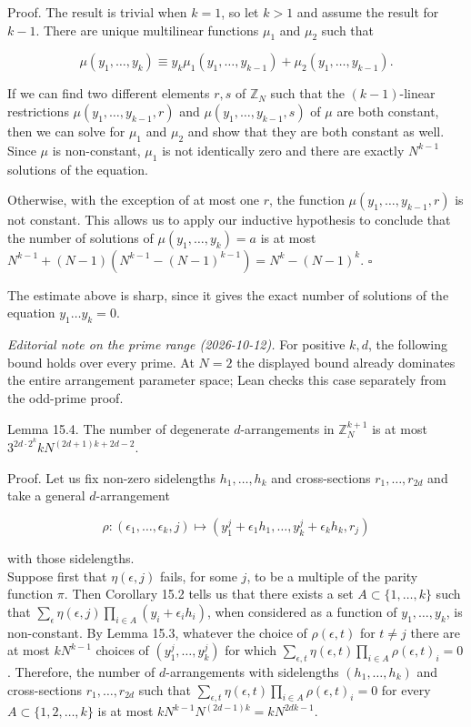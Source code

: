 \documentclass[10pt]{article}
\begin{document}
Proof. The result is trivial when $k=1$, so let $k>1$ and assume the result for $k-1$. There are unique multilinear functions $\mu_{1}$ and $\mu_{2}$ such that

$$
\mu\left(y_{1}, \ldots, y_{k}\right) \equiv y_{k} \mu_{1}\left(y_{1}, \ldots, y_{k-1}\right)+\mu_{2}\left(y_{1}, \ldots, y_{k-1}\right) .
$$

If we can find two different elements $r, s$ of $\mathbb{Z}_{N}$ such that the $(k-1)$-linear restrictions $\mu\left(y_{1}, \ldots, y_{k-1}, r\right)$ and $\mu\left(y_{1}, \ldots, y_{k-1}, s\right)$ of $\mu$ are both constant, then we can solve for $\mu_{1}$ and $\mu_{2}$ and show that they are both constant as well. Since $\mu$ is non-constant, $\mu_{1}$ is not identically zero and there are exactly $N^{k-1}$ solutions of the equation.

Otherwise, with the exception of at most one $r$, the function $\mu\left(y_{1}, \ldots, y_{k-1}, r\right)$ is not constant. This allows us to apply our inductive hypothesis to conclude that the number of solutions of $\mu\left(y_{1}, \ldots, y_{k}\right)=a$ is at most $N^{k-1}+(N-1)\left(N^{k-1}-(N-1)^{k-1}\right)=N^{k}-(N-1)^{k}$. \(\square\)

The estimate above is sharp, since it gives the exact number of solutions of the equation $y_{1} \ldots y_{k}=0$.

\emph{Editorial note on the prime range (2026-10-12).}
For positive $k,d$, the following bound holds over every prime. At $N=2$
the displayed bound already dominates the entire arrangement parameter
space; Lean checks this case separately from the odd-prime proof.

Lemma 15.4. The number of degenerate $d$-arrangements in $\mathbb{Z}_{N}^{k+1}$ is at most $3^{2 d \cdot 2^{k}} k N^{(2 d+1) k+2 d-2}$.

Proof. Let us fix non-zero sidelengths $h_{1}, \ldots, h_{k}$ and cross-sections $r_{1}, \ldots, r_{2 d}$ and take a general $d$-arrangement

$$
\rho:\left(\epsilon_{1}, \ldots, \epsilon_{k}, j\right) \mapsto\left(y_{1}^{j}+\epsilon_{1} h_{1}, \ldots, y_{k}^{j}+\epsilon_{k} h_{k}, r_{j}\right)
$$

with those sidelengths.\\
Suppose first that $\eta(\epsilon, j)$ fails, for some $j$, to be a multiple of the parity function $\pi$. Then Corollary 15.2 tells us that there exists a set $A \subset\{1, \ldots, k\}$ such that $\sum_{\epsilon} \eta(\epsilon, j) \prod_{i \in A}\left(y_{i}+\epsilon_{i} h_{i}\right)$, when considered as a function of $y_{1}, \ldots, y_{k}$, is non-constant. By Lemma 15.3, whatever the choice of $\rho(\epsilon, t)$ for $t \neq j$ there are at most $k N^{k-1}$ choices of $\left(y_{1}^{j}, \ldots, y_{k}^{j}\right)$ for which $\sum_{\epsilon, t} \eta(\epsilon, t) \prod_{i \in A} \rho(\epsilon, t)_{i}=0$. Therefore, the number of $d$-arrangements with sidelengths $\left(h_{1}, \ldots, h_{k}\right)$ and cross-sections $r_{1}, \ldots, r_{2 d}$ such that $\sum_{\epsilon, t} \eta(\epsilon, t) \prod_{i \in A} \rho(\epsilon, t)_{i}=0$ for every $A \subset\{1,2, \ldots, k\}$ is at most $k N^{k-1} N^{(2 d-1) k}=k N^{2 d k-1}$.
\end{document}
